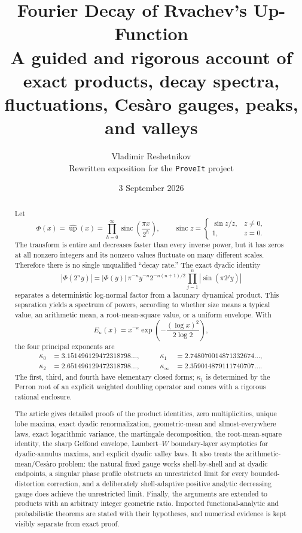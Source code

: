 \documentclass[11pt,oneside]{article}
\title{\bfseries Fourier Decay of Rvachev's Up-Function\\[0.35em]
\large A guided and rigorous account of exact products, decay spectra, fluctuations, Ces\`aro gauges, peaks, and valleys}
\author{Vladimir Reshetnikov\\[0.25em]\small Rewritten exposition for the \texttt{ProveIt} project}
\date{3 September 2026}
\numberwithin{equation}{section}
\theoremstyle{definition}
\theoremstyle{remark}
\newcommand{\abs}[1]{\left|#1\right|}
\newcommand{\sinc}{\operatorname{sinc}}
\newcommand{\up}{\operatorname{up}}
\newcommand{\PhiUp}{\Phi}
\newcommand{\fourier}[1]{\widehat{#1}}
\begin{document}
\maketitle

\begin{abstract}
Let
\[
  \PhiUp(x)=\fourier{\up}(x)
  =\prod_{h=0}^{\infty}\sinc\!\left(\frac{\pi x}{2^h}\right),
  \qquad \sinc z=\begin{cases}\sin z/z,&z\ne0,\\1,&z=0.\end{cases}
\]
The transform is entire and decreases faster than every inverse power, but it has zeros at
all nonzero integers and its nonzero values fluctuate on many different scales.  Therefore
there is no single unqualified ``decay rate.''  The exact dyadic identity
\[
 \abs{\PhiUp(2^ny)}
 =\abs{\PhiUp(y)}\,\pi^{-n}y^{-n}2^{-n(n+1)/2}
   \prod_{j=1}^{n}\abs{\sin(\pi2^jy)}
\]
separates a deterministic log-normal factor from a lacunary dynamical product.  This
separation yields a spectrum of powers, according to whether size means a typical value,
an arithmetic mean, a root-mean-square value, or a uniform envelope.  With
\[
 E_\kappa(x)=x^{-\kappa}
   \exp\!\left(-\frac{(\log x)^2}{2\log2}\right),
\]
the four principal exponents are
\[
 \begin{aligned}
 \kappa_0&=3.151496129472318798\ldots,
 &\qquad \kappa_1&=2.748070014871332674\ldots,\\
 \kappa_2&=2.651496129472318798\ldots,
 &\qquad \kappa_\infty&=2.359014879111740707\ldots .
 \end{aligned}
\]
The first, third, and fourth have elementary closed forms; \(\kappa_1\) is determined by
the Perron root of an explicit weighted doubling operator and comes with a rigorous rational
enclosure.

The article gives detailed proofs of the product identities, zero multiplicities, unique
lobe maxima, exact dyadic renormalization, geometric-mean and almost-everywhere laws, exact
logarithmic variance, the martingale decomposition, the root-mean-square identity, the sharp
Gelfond envelope, Lambert--\(W\) boundary-layer asymptotics for dyadic-annulus maxima, and
explicit dyadic valley laws.  It also treats the arithmetic-mean/Ces\`aro problem: the natural
fixed gauge works shell-by-shell and at dyadic endpoints, a singular phase profile obstructs
an unrestricted limit for every bounded-distortion correction, and a deliberately
shell-adaptive positive analytic decreasing gauge does achieve the unrestricted limit.
Finally, the arguments are extended to products with an arbitrary integer geometric ratio.
Imported functional-analytic and probabilistic theorems are stated with their hypotheses,
and numerical evidence is kept visibly separate from exact proof.
\end{abstract}
\end{document}
